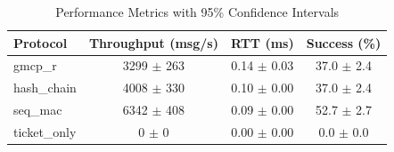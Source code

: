 \begin{table}[t]
\centering
\caption{Performance Metrics with 95\% Confidence Intervals}
\begin{tabular}{lccc}
\toprule
Protocol & Throughput (msg/s) & RTT (ms) & Success (\%) \\
\midrule
gmcp_r & 3299 $\pm$ 263 & 0.14 $\pm$ 0.03 & 37.0 $\pm$ 2.4 \\
hash_chain & 4008 $\pm$ 330 & 0.10 $\pm$ 0.00 & 37.0 $\pm$ 2.4 \\
seq_mac & 6342 $\pm$ 408 & 0.09 $\pm$ 0.00 & 52.7 $\pm$ 2.7 \\
ticket_only & 0 $\pm$ 0 & 0.00 $\pm$ 0.00 & 0.0 $\pm$ 0.0 \\
\bottomrule
\end{tabular}
\label{tab:confidence_intervals}
\end{table}